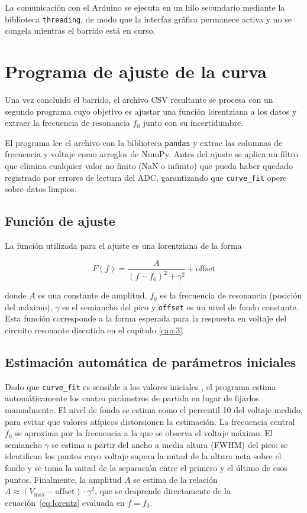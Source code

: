 La comunicación con el Arduino se ejecuta en un hilo secundario mediante la biblioteca \texttt{threading}, de modo que la interfaz gráfica permanece activa y no se congela mientras el barrido está en curso.

\section{Programa de ajuste de la curva}

Una vez concluido el barrido, el archivo CSV resultante se procesa con un segundo programa cuyo objetivo es ajustar una función lorentziana a los datos y extraer la frecuencia de resonancia $f_0$ junto con su incertidumbre.

El programa lee el archivo con la biblioteca \texttt{pandas} y extrae las columnas de frecuencia y voltaje como arreglos de NumPy. Antes del ajuste se aplica un filtro que elimina cualquier valor no finito (NaN o infinito) que pueda haber quedado registrado por errores de lectura del ADC, garantizando que \texttt{curve\_fit} opere sobre datos limpios.

\subsection{Función de ajuste}

La función utilizada para el ajuste es una lorentziana de la forma

\begin{equation}\label{eq:lorentz}
    F(f) = \frac{A}{(f - f_0)^2 + \gamma^2} + \text{offset}
\end{equation}

donde $A$ es una constante de amplitud, $f_0$ es la frecuencia de resonancia (posición del máximo), $\gamma$ es el semiancho del pico y \texttt{offset} es un nivel de fondo constante. Esta función corresponde a la forma esperada para la respuesta en voltaje del circuito resonante discutida en el capítulo \ref{cap:3}.

\subsection{Estimación automática de parámetros iniciales}

Dado que \texttt{curve\_fit} es sensible a los valores iniciales \cite{scipy_curvefit}, el programa estima automáticamente los cuatro parámetros de partida en lugar de fijarlos manualmente. El nivel de fondo se estima como el percentil 10 del voltaje medido, para evitar que valores atípicos distorsionen la estimación. La frecuencia central $f_0$ se aproxima por la frecuencia a la que se observa el voltaje máximo. El semiancho $\gamma$ se estima a partir del ancho a media altura (FWHM) del pico: se identifican los puntos cuyo voltaje supera la mitad de la altura neta sobre el fondo y se toma la mitad de la separación entre el primero y el último de esos puntos. Finalmente, la amplitud $A$ se estima de la relación $A \approx (V_{\max} - \text{offset})\cdot\gamma^2$, que se desprende directamente de la ecuación~\ref{eq:lorentz} evaluada en $f=f_0$.

